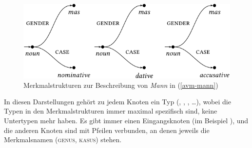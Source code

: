 \begin{figure}
\centerline{%
\includegraphics{Figures/mann-model-theoretic-cropped}
}
\caption{\label{abb-avm-mann}Merkmalstrukturen zur Beschreibung von \emph{Mann} in  (\ref{avm-mann})}
\end{figure}
In diesen Darstellungen gehört zu jedem Knoten ein Typ (, , ,
\ldots), wobei die Typen in den Merkmalstrukturen immer maximal spezifisch sind, \dash keine
Untertypen mehr haben. Es gibt immer einen Eingangsknoten (im Beispiel ), und die anderen
Knoten sind mit Pfeilen verbunden, an denen jeweils die Merkmalsnamen (\textsc{genus}, \textsc{kasus}) stehen.

